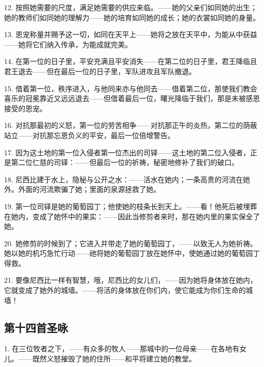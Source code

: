 12. 按照她需要的尺度，满足她需要的供应来临。——她的父亲们如同她的出生；她的教师们如同她的理解力——她的培育如同她的成长；她的衣裳如同她的身量。\par

13. 恩宠称量并赐予这一切，如同在天平上——她将之放在天平中，为能从中获益——她将它们纳入传承，为能成就完美。\par

14. 在第一位的日子里，平安充满且平安消失——在第二位的日子里，君王降临且君王退去——但在最后一位的日子里，军队进攻且军队撤退。\par

15. 借着第一位，秩序进入，与他同来亦与他同去——借着第二位，那使我们教会喜乐的冠冕靠近又远远退去——但借着最后一位，曙光降临于我们，那是未被感恩接受的恩宠。\par

16. 对抗那最初的义怒，第一位的劳苦相争——对抗那正午的炎热，第二位的荫蔽站立——对抗那忘恩负义的平安，最后一位倍增警告。\par

17. 因为这土地的第一位入侵者第一位杰出的司铎——这土地的第二位入侵者，正是第二位仁慈的司铎：——但最后一位的祈祷，秘密地修补了我们的破口。\par

18. 尼西比建于水上，隐秘与公开之水：——活水在她内；一条高贵的河流在她外。外面的河流欺骗了她；里面的泉源拯救了她。\par

19. 第一位司铎是她的葡萄园丁；他使她的枝条长到天上。——看！他死后被埋葬在她内，变成了她怀中的果实：——因此当修剪者来时，那在她内里的果实保全了她。\par

20. 她修剪的时候到了；它进入并带走了她的葡萄园丁，——以致无人为她祈祷。她以她的机巧急忙行动——祂将她的葡萄园丁放在她怀中，使她通过她的葡萄园丁得救。\par

21. 要像尼西比一样有智慧，哦，尼西比的女儿们，——因为她将身体放在她内，它就变成了她外的城墙。——将活的身体放在你们内，使它能成为你们生命的城墙！\par


\subsection{第十四首圣咏}

1. 在三位牧者之下，——有众多的牧人——那城中的一位母亲——在各地有女儿。——既然义怒摧毁了她的住所——和平将建立她的教堂。\par

